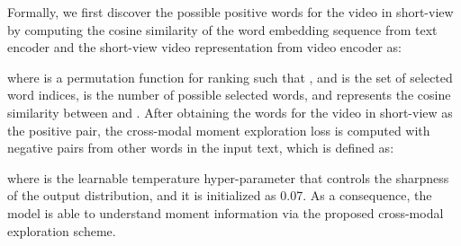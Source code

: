 \documentclass[10pt,twocolumn,letterpaper]{article}
\begin{document}
Formally, we first discover the possible positive words for the video in short-view by computing the cosine similarity of the word embedding sequence  from text encoder and the short-view video representation  from video encoder as:

where  is a permutation function for ranking such that , and  is the set of selected word indices,  is the number of possible selected words, and  represents the cosine similarity between  and . After obtaining the words for the video in short-view as the positive pair, the cross-modal moment exploration loss  is computed with negative pairs from other words in the input text, which is defined as:

where  is the learnable temperature hyper-parameter that controls the sharpness of the output distribution, and it is initialized as 0.07. As a consequence, the model is able to understand moment information via the proposed cross-modal exploration scheme.
\end{document}
